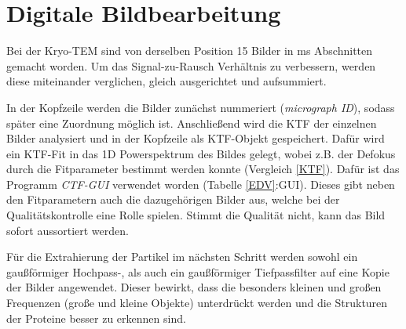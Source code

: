 \section{Digitale Bildbearbeitung} %
\label{sec:bildbearbeitung}

Bei der Kryo-TEM sind von derselben Position 15 Bilder in \unit[200]{ms} Abschnitten gemacht worden.
Um das Signal-zu-Rausch Verhältnis zu verbessern, werden diese miteinander verglichen, gleich ausgerichtet und aufsummiert.

In der Kopfzeile werden die Bilder zunächst nummeriert (\textit{micrograph ID}), sodass später eine Zuordnung möglich ist.
Anschließend wird die KTF der einzelnen Bilder analysiert und in der Kopfzeile als KTF-Objekt gespeichert.
Dafür wird ein KTF-Fit in das 1D Powerspektrum des Bildes gelegt, wobei z.B. der Defokus durch die Fitparameter bestimmt werden konnte (Vergleich \eqref{KTF}).
Dafür ist das Programm \textit{CTF-GUI} verwendet worden (Tabelle \ref{EDV}:GUI).
Dieses gibt neben den Fitparametern auch die dazugehörigen Bilder aus, welche bei der Qualitätskontrolle eine Rolle spielen.
Stimmt die Qualität nicht, kann das Bild sofort aussortiert werden.

Für die Extrahierung der Partikel im nächsten Schritt werden sowohl ein gaußförmiger Hochpass-, als auch ein gaußförmiger Tiefpassfilter auf eine Kopie der Bilder angewendet.
Dieser bewirkt, dass die besonders kleinen und großen Frequenzen (große und kleine Objekte) unterdrückt werden und die Strukturen der Proteine besser zu erkennen sind.

\FloatBarrier